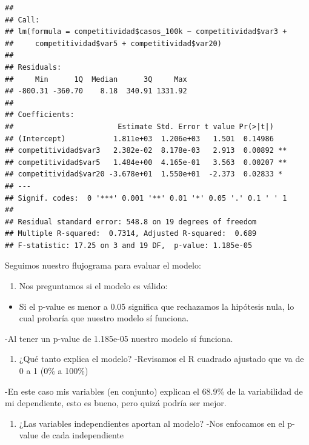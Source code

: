\documentclass[
]{article}
\providecommand{\tightlist}{%
  \setlength{\itemsep}{0pt}\setlength{\parskip}{0pt}}
\begin{document}
\begin{verbatim}
## 
## Call:
## lm(formula = competitividad$casos_100k ~ competitividad$var3 + 
##     competitividad$var5 + competitividad$var20)
## 
## Residuals:
##     Min      1Q  Median      3Q     Max 
## -800.31 -360.70    8.18  340.91 1331.92 
## 
## Coefficients:
##                        Estimate Std. Error t value Pr(>|t|)   
## (Intercept)           1.811e+03  1.206e+03   1.501  0.14986   
## competitividad$var3   2.382e-02  8.178e-03   2.913  0.00892 **
## competitividad$var5   1.484e+00  4.165e-01   3.563  0.00207 **
## competitividad$var20 -3.678e+01  1.550e+01  -2.373  0.02833 * 
## ---
## Signif. codes:  0 '***' 0.001 '**' 0.01 '*' 0.05 '.' 0.1 ' ' 1
## 
## Residual standard error: 548.8 on 19 degrees of freedom
## Multiple R-squared:  0.7314, Adjusted R-squared:  0.689 
## F-statistic: 17.25 on 3 and 19 DF,  p-value: 1.185e-05
\end{verbatim}

Seguimos nuestro flujograma para evaluar el modelo:

\begin{enumerate}
\def\labelenumi{\arabic{enumi}.}
\tightlist
\item
  Nos preguntamos si el modelo es válido:
\end{enumerate}

\begin{itemize}
\tightlist
\item
  Si el p-value es menor a 0.05 significa que rechazamos la hipótesis
  nula, lo cual probaría que nuestro modelo sí funciona.
\end{itemize}

-Al tener un p-value de 1.185e-05 nuestro modelo sí funciona.

\begin{enumerate}
\def\labelenumi{\arabic{enumi}.}
\setcounter{enumi}{1}
\tightlist
\item
  ¿Qué tanto explica el modelo? -Revisamos el R cuadrado ajustado que va
  de 0 a 1 (0\% a 100\%)
\end{enumerate}

-En este caso mis variables (en conjunto) explican el 68.9\% de la
variabilidad de mi dependiente, esto es bueno, pero quizá podría ser
mejor.

\begin{enumerate}
\def\labelenumi{\arabic{enumi}.}
\setcounter{enumi}{2}
\tightlist
\item
  ¿Las variables independientes aportan al modelo? -Nos enfocamos en el
  p-value de cada independiente
\end{enumerate}
\end{document}
